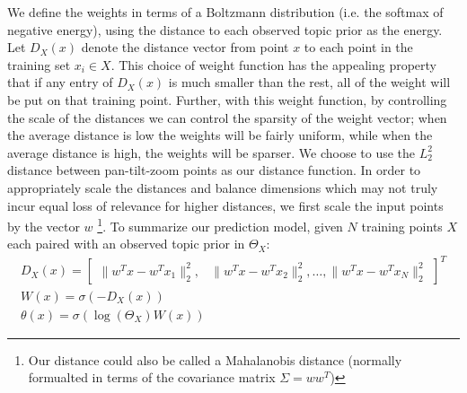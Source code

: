We define the weights in terms of a Boltzmann distribution (i.e. the softmax of negative energy), using the distance to each observed topic prior as the energy. Let $D_X(x)$ denote the distance vector from point $x$ to each point in the training set $x_i \in X$. This choice of weight function has the appealing property that if any entry of $D_X(x)$ is much smaller than the rest, all of the weight will be put on that training point. Further, with this weight function, by controlling the scale of the distances we can control the sparsity of the weight vector; when the average distance is low the weights will be fairly uniform, while when the average distance is high, the weights will be sparser. We choose to use the $\mathit{L}_2^2$ distance between pan-tilt-zoom points as our distance function. In order to appropriately scale the distances and balance dimensions which may not truly incur equal loss of relevance for higher distances, we first scale the input points by the vector $w$ \footnote{Our distance could also be called a Mahalanobis distance (normally formualted in terms of the covariance matrix $\Sigma = ww^T$)}. To summarize our prediction model, given $N$ training points $X$ each paired with an observed topic prior in $\Theta_X$:
\begin{equation} \label{eqn:spatial-prediction}
\begin{split}
    D_X(x) = 
    \begin{bmatrix}
    \|w^Tx - w^T x_1 \|_2^2, & \|w^Tx - w^T x_2 \|_2^2, \ldots, \|w^Tx - w^T x_N \|_2^2
    \end{bmatrix}^T\\
    W(x) = \sigma \left( -D_{X}(x) \right)\\
    \theta(x) = \sigma \left( \log \left(\Theta_X \right) W(x) \right)
\end{split}
\end{equation}

